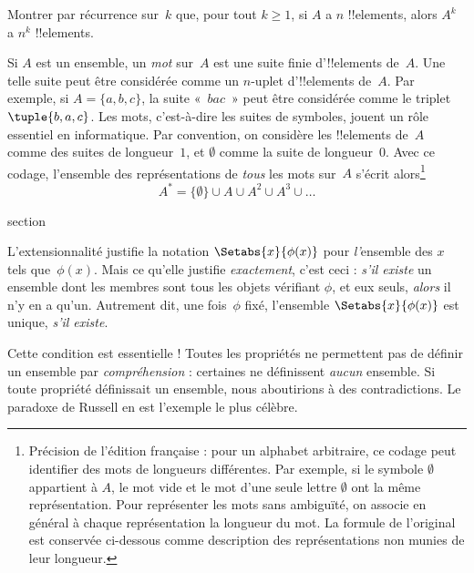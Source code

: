 \documentclass[11pt,a4paper,openany]{memoir}
\begin{document}
\begin{prob}
Montrer par récurrence sur~$k$ que, pour tout $k \ge 1$,
si $A$ a $n$ !!{element}s, alors $A^k$ a $n^k$ !!{element}s.
\end{prob}

\begin{ex}
Si $A$ est un ensemble, un \emph{mot} sur~$A$ est une suite
finie d'!!{element}s de~$A$. Une telle suite peut être considérée
comme un $n$-uplet d'!!{element}s de~$A$. Par exemple, si
$A = \{a, b, c\}$, la suite «~$bac$~» peut être considérée
comme le triplet~$\tuple{b, a, c}$.
Les mots, c'est-à-dire les suites de symboles, jouent un rôle
essentiel en informatique. Par convention, on considère les
!!{element}s de~$A$ comme des suites de longueur~$1$,
et $\emptyset$ comme la suite de longueur~$0$.
Avec ce codage, l'ensemble des représentations de \emph{tous}
les mots sur~$A$ s'écrit alors\footnote{Précision de l'édition
française : pour un alphabet arbitraire, ce codage peut identifier
des mots de longueurs différentes. Par exemple, si le symbole
$\emptyset$ appartient à $A$, le mot vide et le mot d'une seule
lettre $\emptyset$ ont la même représentation. Pour représenter
les mots sans ambiguïté, on associe en général à chaque
représentation la longueur du mot. La formule de l'original
est conservée ci-dessous comme description des représentations
non munies de leur longueur.}
\[
A^* = \{\emptyset\} \cup A \cup A^2 \cup A^3 \cup \dots
\]
\end{ex}


\endgroup



\begingroup
\expandafter\def\csname ol@sectioncs\endcsname{section}
\def\olfilename{russells-paradox}



L'extensionnalité justifie la notation $\Setabs{x}{\phi(x)}$ pour
\emph{l'}ensemble des $x$ tels que~$\phi(x)$. Mais ce qu'elle
justifie \emph{exactement}, c'est ceci : \emph{s'il existe}
un ensemble dont les membres sont tous les objets vérifiant
$\phi$, et eux seuls, \emph{alors} il n'y en a qu'un.
Autrement dit, une fois~$\phi$ fixé, l'ensemble
$\Setabs{x}{\phi(x)}$ est unique, \emph{s'il existe}.

Cette condition est essentielle !{} Toutes les propriétés ne
permettent pas de définir un ensemble par \emph{compréhension} :
certaines ne définissent \emph{aucun} ensemble.
Si toute propriété définissait un ensemble, nous aboutirions
à des contradictions. Le paradoxe de Russell en est l'exemple
le plus célèbre.
\end{document}
